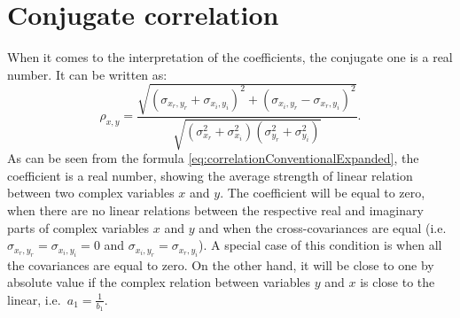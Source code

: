 \documentclass[
]{book}
\begin{document}
\hypertarget{conjugate-correlation}{%
\section{Conjugate correlation}\label{conjugate-correlation}}

When it comes to the interpretation of the coefficients, the conjugate one is a real number. It can be written as:
\begin{equation}
    {\rho}_{x,y} = \frac{\sqrt{(\sigma_{x_r, y_r} + \sigma_{x_i, y_i})^2 + (\sigma_{x_i, y_r} - \sigma_{x_r, y_i})^2}}{\sqrt{(\sigma_{x_r}^2 + \sigma_{x_i}^2)(\sigma_{y_r}^2 + \sigma_{y_i}^2)}} .
    \label{eq:correlationConventionalExpanded}
\end{equation}
As can be seen from the formula \eqref{eq:correlationConventionalExpanded}, the coefficient is a real number, showing the average strength of linear relation between two complex variables \(x\) and \(y\). The coefficient will be equal to zero, when there are no linear relations between the respective real and imaginary parts of complex variables \(x\) and \(y\) and when the cross-covariances are equal (i.e.~\(\sigma_{x_r, y_r}=\sigma_{x_i, y_i}=0\) and \(\sigma_{x_i, y_r} = \sigma_{x_r, y_i}\)). A special case of this condition is when all the covariances are equal to zero. On the other hand, it will be close to one by absolute value if the complex relation between variables \(y\) and \(x\) is close to the linear, i.e.~\(a_1 = \frac{1}{b_1}\).
\end{document}
